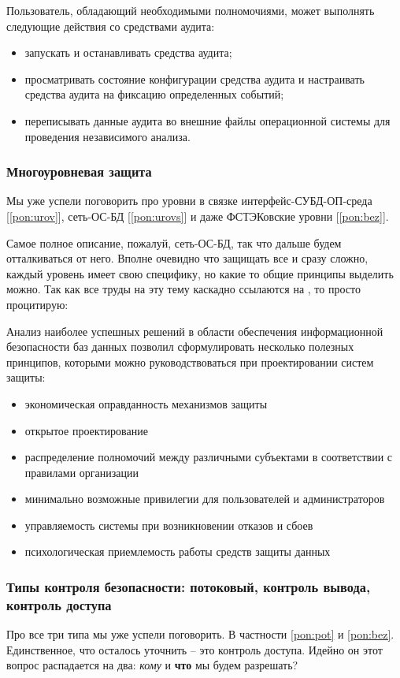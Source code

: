 Пользователь, обладающий необходимыми полномочиями, может выполнять следующие действия со средствами аудита:
\begin{itemize}
	\item запускать и останавливать средства аудита;
	\item просматривать состояние конфигурации средства аудита и настраивать средства аудита на фиксацию определенных событий;
	\item переписывать данные аудита во внешние файлы операционной системы для проведения независимого анализа.
\end{itemize}

\subsubsection{Многоуровневая защита}
Мы уже успели поговорить про уровни в связке интерфейс-СУБД-ОП-среда [\ref{pon:urov}],  сеть-ОС-БД [\ref{pon:urovs}] и даже ФСТЭКовские уровни [\ref{pon:bez}].

Самое полное описание, пожалуй, сеть-ОС-БД, так что дальше будем отталкиваться от него. Вполне очевидно что защищать все и сразу сложно, каждый уровень имеет свою специфику, но какие то общие принципы выделить можно. Так как все труды на эту тему каскадно ссылаются на \autocite{Smirnov2007}, то просто процитирую:
\begin{grayquote}
	Анализ наиболее успешных решений в области обеспе­чения информационной безопасности баз данных позволил сформулировать несколько полезных принципов, которыми можно руководствоваться при проектировании систем защиты:
	\begin{itemize}
		\item экономическая оправданность механизмов защиты
		\item открытое проектирование
		\item распределение полномочий между различными субъектами в соответствии с правилами организации
		\item минимально возможные привилегии для пользователей и администраторов
		\item управляемость системы при возникновении отказов и сбоев
		\item психологическая приемлемость работы средств защиты данных
	\end{itemize}
\end{grayquote}

\subsubsection{Типы контроля безопасности: потоковый, контроль вывода, контроль доступа}
Про все три типа мы уже успели поговорить. В частности \ref{pon:pot} и \ref{pon:bez}. Единственное, что осталось уточнить -- это контроль доступа. Идейно он этот вопрос распадается на два: \textit{кому} и \textbf{что} мы будем разрешать?

